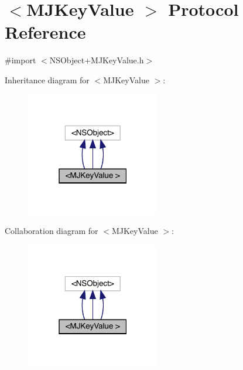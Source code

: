 \hypertarget{protocol_m_j_key_value_01-p}{}\section{$<$M\+J\+Key\+Value $>$ Protocol Reference}
\label{protocol_m_j_key_value_01-p}


{\ttfamily \#import $<$N\+S\+Object+\+M\+J\+Key\+Value.\+h$>$}



Inheritance diagram for $<$M\+J\+Key\+Value $>$\+:\nopagebreak
\begin{figure}[H]
\begin{center}
\leavevmode
\includegraphics[width=166pt]{protocol_m_j_key_value_01-p__inherit__graph}
\end{center}
\end{figure}


Collaboration diagram for $<$M\+J\+Key\+Value $>$\+:\nopagebreak
\begin{figure}[H]
\begin{center}
\leavevmode
\includegraphics[width=166pt]{protocol_m_j_key_value_01-p__coll__graph}
\end{center}
\end{figure}
